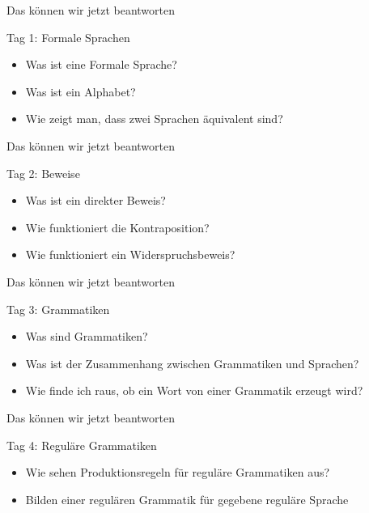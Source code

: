 \begin{frame}[fragile]{Das können wir jetzt beantworten}
    \begin{alertblock}{Tag 1: Formale Sprachen}
        \begin{itemize}
            \item Was ist eine Formale Sprache?
            \item Was ist ein Alphabet?
            \item Wie zeigt man, dass zwei Sprachen äquivalent sind?
        \end{itemize}
    \end{alertblock}
\end{frame}



\begin{frame}[fragile]{Das können wir jetzt beantworten}
    \begin{alertblock}{Tag 2: Beweise}
        \begin{itemize}
            \item Was ist ein direkter Beweis?
            \item Wie funktioniert die Kontraposition?
            \item Wie funktioniert ein Widerspruchsbeweis?
        \end{itemize}
    \end{alertblock}
\end{frame}



\begin{frame}[fragile]{Das können wir jetzt beantworten}
    \begin{alertblock}{Tag 3: Grammatiken}
        \begin{itemize}
            \item Was sind Grammatiken?
            \item Was ist der Zusammenhang zwischen Grammatiken und Sprachen?
            \item Wie finde ich raus, ob ein Wort von einer Grammatik erzeugt wird?
        \end{itemize}
    \end{alertblock}
\end{frame}

\begin{frame}[fragile]{Das können wir jetzt beantworten}
    \begin{alertblock}{Tag 4: Reguläre Grammatiken}
        \begin{itemize}
            \item Wie sehen Produktionsregeln für reguläre Grammatiken aus?
            \item Bilden einer regulären Grammatik für gegebene reguläre Sprache
        \end{itemize}
    \end{alertblock}
\end{frame}

